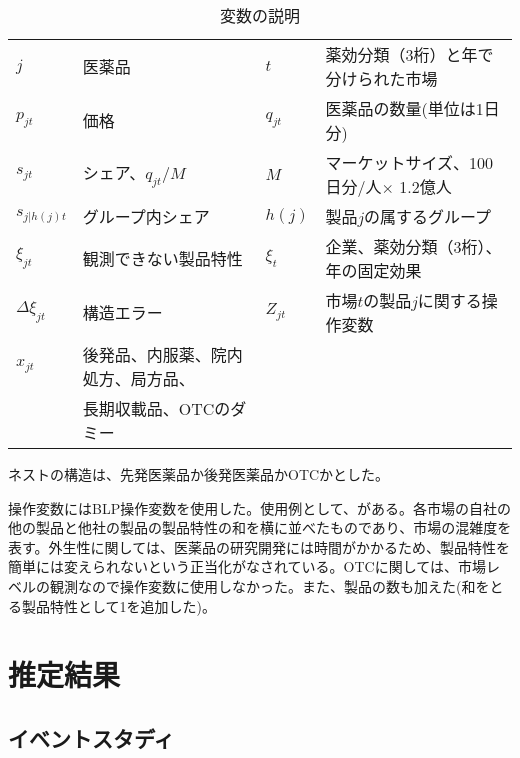 \documentclass[a4paper,11pt,uplatex]{jsarticle}
\theoremstyle{definition}
\begin{document}
\begin{table}[H]\centering \caption{変数の説明}
    \small
    \begin{tabular}{llll}
        \toprule \label{tab:demand_}
        \(j\) & 医薬品&$t$ &薬効分類（3桁）と年で分けられた市場 \\
        $p_{jt}$ &価格 & $q_{jt}$ &医薬品の数量(単位は1日分)\\ 
        $s_{jt}$ &シェア、$q_{jt}/M$ & $M$ &マーケットサイズ、100日分/人$\times$ 1.2億人\\
        $s_{j|h(j)t}$ & グループ内シェア & $h(j)$ &製品\(j\)の属するグループ\\
        $\xi_{jt}$ & 観測できない製品特性& $\xi_t$ &企業、薬効分類（3桁）、年の固定効果 \\
        $\Delta \xi_{jt}$ & 構造エラー &$Z_{jt}$ &市場\(t\)の製品\(j\)に関する操作変数 \\
        $x_{jt}$ & 後発品、内服薬、院内処方、局方品、& &  \\
         & 長期収載品、OTCのダミー & &\\
         \bottomrule
    \end{tabular}
\end{table}
ネストの構造は、先発医薬品か後発医薬品かOTCかとした。

操作変数にはBLP操作変数を使用した。使用例として、\cite{Iizuka2007}がある。各市場の自社の他の製品と他社の製品の製品特性の和を横に並べたものであり、市場の混雑度を表す。外生性に関しては、医薬品の研究開発には時間がかかるため、製品特性を簡単には変えられないという正当化がなされている。OTCに関しては、市場レベルの観測なので操作変数に使用しなかった。また、製品の数も加えた(和をとる製品特性として1を追加した)。

\section{推定結果} 
\subsection{イベントスタディ}
\end{document}
